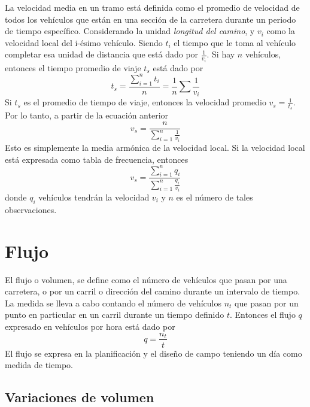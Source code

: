 La velocidad media en un tramo está definida como el promedio de velocidad de todos los vehículos que están en una sección de la carretera durante un periodo de tiempo específico. Considerando la unidad \emph{longitud del camino}, y $v_{i}$ como la velocidad local del i-ésimo vehículo. Siendo $t_{i}$ el tiempo que le toma al vehículo completar esa unidad de distancia que está dado por $\frac { 1 }{ { v }_{ i } }$. Si hay $n$ vehículos, entonces el tiempo promedio de viaje $t_s$ está dado por
\begin{equation}
{ t }_{ s }=\frac { \sum _{ i=1 }^{ n }{ { t }_{ i } }  }{ n } =\frac { 1 }{ n } \sum { \frac { 1 }{ { v }_{ i } }  }
\end{equation}
Si $t_{s}$ es el promedio de tiempo de viaje, entonces la velocidad promedio ${ v }_{ s }=\frac { 1 }{ { t }_{ s } }$. Por lo tanto, a partir de la ecuación anterior
\begin{equation}
{ v }_{ s }=\frac { n }{ \sum _{ i=1 }^{ n }{ \frac { 1 }{ { v }_{ i } }  }  }
\end{equation}
Esto es simplemente la media armónica de la velocidad local. Si la velocidad local está expresada como tabla de frecuencia, entonces
\begin{equation}
{ v }_{ s }=\frac { \sum _{ i=1 }^{ n }{ { q }_{ i } }  }{ \sum _{ i=1 }^{ n }{ \frac { { q }_{ i } }{ { v }_{ i } }  }  } 
\end{equation}
donde $q_{i}$ vehículos tendrán la velocidad $v_{i}$ y $n$ es el número de tales observaciones.

\section{Flujo}

El flujo o volumen, se define como el número de vehículos que pasan por una carretera, o por un carril o dirección del camino durante un intervalo de tiempo. La medida se lleva a cabo contando el número de vehículos $n_{t}$ que pasan por un punto en particular en un carril durante un tiempo definido $t$. Entonces el flujo $q$ expresado en vehículos por hora está dado por
\begin{equation}
q=\frac { { n }_{ t } }{ t }
\end{equation}
El flujo se expresa en la planificación y el diseño de campo teniendo un día como medida de tiempo.

\subsection{Variaciones de volumen}

